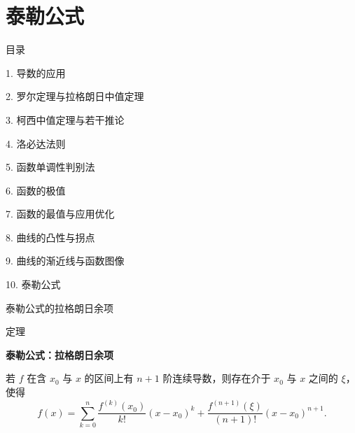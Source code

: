 \documentclass[aspectratio=169,10pt,fontset=fandol]{ctexbeamer}
\begin{document}
\section{泰勒公式}
\begin{frame}[t,fragile]{目录}
\normalsize
{\color{black}\normalsize 1. 导数的应用\par}\vspace{0.22em}
{\color{black}\normalsize 2. 罗尔定理与拉格朗日中值定理\par}\vspace{0.22em}
{\color{black}\normalsize 3. 柯西中值定理与若干推论\par}\vspace{0.22em}
{\color{black}\normalsize 4. 洛必达法则\par}\vspace{0.22em}
{\color{black}\normalsize 5. 函数单调性判别法\par}\vspace{0.22em}
{\color{black}\normalsize 6. 函数的极值\par}\vspace{0.22em}
{\color{black}\normalsize 7. 函数的最值与应用优化\par}\vspace{0.22em}
{\color{black}\normalsize 8. 曲线的凸性与拐点\par}\vspace{0.22em}
{\color{black}\normalsize 9. 曲线的渐近线与函数图像\par}\vspace{0.22em}
{\color{blue}\normalsize 10. 泰勒公式\par}\vspace{0.22em}
\end{frame}
\begin{frame}[t,fragile]{泰勒公式的拉格朗日余项}
\footnotesize
\begin{block}{定理}
{\footnotesize
\textbf{泰勒公式：拉格朗日余项}\par

若 $f$ 在含 $x_0$ 与 $x$ 的区间上有 $n+1$ 阶连续导数，则存在介于 $x_0$ 与 $x$ 之间的 $\xi$，使得
\[
f(x)=\sum_{k=0}^{n}\frac{f^{(k)}(x_0)}{k!}(x-x_0)^k
+\frac{f^{(n+1)}(\xi)}{(n+1)!}(x-x_0)^{n+1}.
\]

}
\end{block}
\end{frame}
\end{document}
